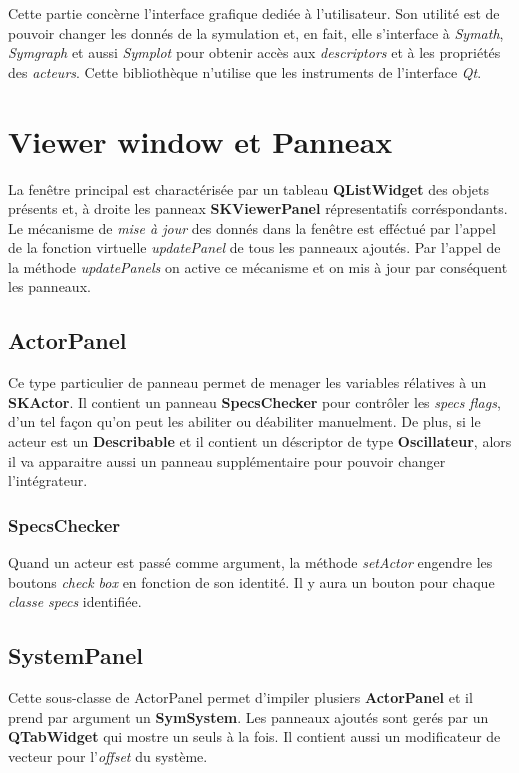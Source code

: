 \documentclass{report}
\begin{document}
Cette partie concèrne l'interface grafique dediée à l'utilisateur.
Son utilité est de pouvoir changer les donnés de la symulation et, en fait, 
elle s'interface à \textit{Symath}, \textit{Symgraph} et aussi \textit{Symplot} 
pour obtenir accès aux \textit{descriptors} et à les propriétés des
\textit{acteurs}. 
Cette bibliothèque n'utilise que les instruments de l'interface \textit{Qt}.

\section{Viewer window et Panneax}

La fenêtre principal est charactérisée par un tableau \textbf{QListWidget} des objets présents et,
à droite les panneax \textbf{SKViewerPanel} répresentatifs corréspondants. 
Le mécanisme de \textit{mise à jour} des donnés dans la fenêtre est efféctué par 
l'appel de la fonction virtuelle \textit{updatePanel} de tous les panneaux
ajoutés. Par l'appel de la méthode \textit{updatePanels} on active ce mécanisme 
et on mis à jour par conséquent les panneaux.

\subsection{ActorPanel}

Ce type particulier de panneau permet de menager les variables rélatives
à un \textbf{SKActor}. Il contient un panneau \textbf{SpecsChecker} pour 
contrôler les \textit{specs flags}, d'un tel façon qu'on peut les abiliter ou 
déabiliter manuelment. De plus, si le acteur est un \textbf{Describable} et il 
contient un déscriptor de type \textbf{Oscillateur}, alors il va apparaitre aussi 
un panneau supplémentaire pour pouvoir changer l'intégrateur.

\subsubsection{SpecsChecker}

Quand un acteur est passé comme argument, la méthode \textit{setActor} engendre 
les boutons \textit{check box} en fonction de son identité. Il y aura un bouton 
pour chaque \textit{classe specs} identifiée.

\subsection{SystemPanel}

Cette sous-classe de ActorPanel permet d'impiler plusiers \textbf{ActorPanel} 
et il prend par argument un \textbf{SymSystem}. Les panneaux ajoutés sont gerés
par un \textbf{QTabWidget} qui mostre un seuls à la fois.
Il contient aussi un modificateur de vecteur pour l'\textit{offset} du système.
\end{document}
